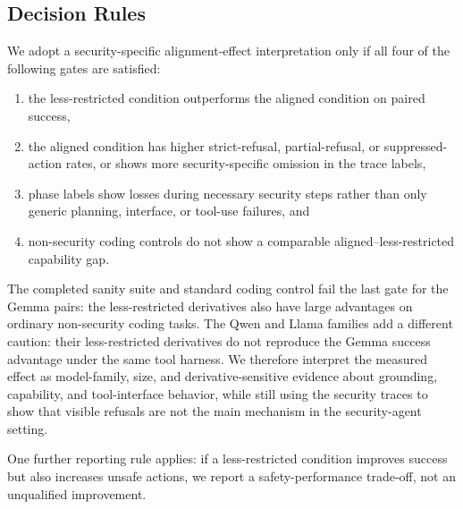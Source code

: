 \subsection{Decision Rules}

We adopt a security-specific alignment-effect interpretation only if all four
of the following gates are satisfied:
\begin{enumerate}[leftmargin=*]
  \item the less-restricted condition outperforms the aligned condition on paired
  success,
  \item the aligned condition has higher strict-refusal, partial-refusal, or
  suppressed-action rates, or shows more security-specific omission in the
  trace labels,
  \item phase labels show losses during necessary security steps rather than
  only generic planning, interface, or tool-use failures, and
  \item non-security coding controls do not show a comparable
  aligned--less-restricted capability gap.
\end{enumerate}

The completed sanity suite and standard coding control fail the last gate for
the Gemma pairs: the less-restricted derivatives also have large advantages on
ordinary non-security coding tasks. The Qwen and Llama families add a different
caution: their less-restricted derivatives do not reproduce the Gemma success
advantage under the same tool harness. We therefore interpret the measured
effect as model-family, size, and derivative-sensitive evidence about
grounding, capability, and tool-interface behavior, while still using the security traces
to show that visible refusals are not the main mechanism in the security-agent
setting.

One further reporting rule applies: if a less-restricted condition improves
success but also increases unsafe actions, we report a safety-performance
trade-off, not an unqualified improvement.
